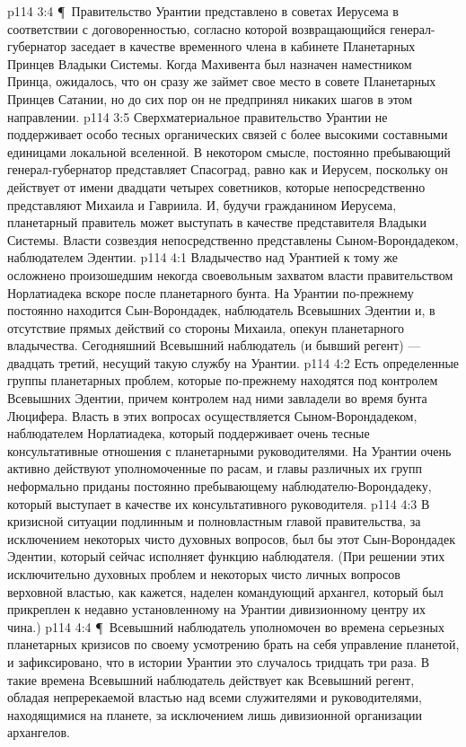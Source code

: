 \vs p114 3:4 \P\ Правительство Урантии представлено в советах Иерусема в соответствии с договоренностью, согласно которой возвращающийся генерал\hyp{}губернатор заседает в качестве временного члена в кабинете Планетарных Принцев Владыки Системы. Когда Махивента был назначен наместником Принца, ожидалось, что он сразу же займет свое место в совете Планетарных Принцев Сатании, но до сих пор он не предпринял никаких шагов в этом направлении.
\vs p114 3:5 Сверхматериальное правительство Урантии не поддерживает особо тесных органических связей с более высокими составными единицами локальной вселенной. В некотором смысле, постоянно пребывающий генерал\hyp{}губернатор представляет Спасоград, равно как и Иерусем, поскольку он действует от имени двадцати четырех советников, которые непосредственно представляют Михаила и Гавриила. И, будучи гражданином Иерусема, планетарный правитель может выступать в качестве представителя Владыки Системы. Власти созвездия непосредственно представлены Сыном\hyp{}Ворондадеком, наблюдателем Эдентии.
\vs p114 4:1 Владычество над Урантией к тому же осложнено произошедшим некогда своевольным захватом власти правительством Норлатиадека вскоре после планетарного бунта. На Урантии по\hyp{}прежнему постоянно находится Сын\hyp{}Ворондадек, наблюдатель Всевышних Эдентии и, в отсутствие прямых действий со стороны Михаила, опекун планетарного владычества. Сегодняшний Всевышний наблюдатель (и бывший регент) --- двадцать третий, несущий такую службу на Урантии.
\vs p114 4:2 Есть определенные группы планетарных проблем, которые по\hyp{}прежнему находятся под контролем Всевышних Эдентии, причем контролем над ними завладели во время бунта Люцифера. Власть в этих вопросах осуществляется Сыном\hyp{}Ворондадеком, наблюдателем Норлатиадека, который поддерживает очень тесные консультативные отношения с планетарными руководителями. На Урантии очень активно действуют уполномоченные по расам, и главы различных их групп неформально приданы постоянно пребывающему наблюдателю\hyp{}Ворондадеку, который выступает в качестве их консультативного руководителя.
\vs p114 4:3 В кризисной ситуации подлинным и полновластным главой правительства, за исключением некоторых чисто духовных вопросов, был бы этот Сын\hyp{}Ворондадек Эдентии, который сейчас исполняет функцию наблюдателя. (При решении этих исключительно духовных проблем и некоторых чисто личных вопросов верховной властью, как кажется, наделен командующий архангел, который был прикреплен к недавно установленному на Урантии дивизионному центру их чина.)
\vs p114 4:4 \P\ Всевышний наблюдатель уполномочен во времена серьезных планетарных кризисов по своему усмотрению брать на себя управление планетой, и зафиксировано, что в истории Урантии это случалось тридцать три раза. В такие времена Всевышний наблюдатель действует как Всевышний регент, обладая непререкаемой властью над всеми служителями и руководителями, находящимися на планете, за исключением лишь дивизионной организации архангелов.
